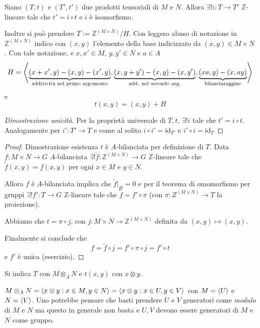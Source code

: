 \begin{proposition}{}
    Siano \({(T, t)}\) e \({(T', t')}\) due prodotti tensoriali di \(M\) e
    \(N\). Allora \(\exists ! i : T \to T'\) \(\mathbb{Z}\)-lineare tale che
    \(t' = i \circ t\) e \(i\) è isomorfismo.

    Inoltre si può prendere \(T := \mathbb{Z}^{{(M \times N)}} / H\). Con
    leggero abuso di notazione in \(\mathbb{Z}^{{(M \times  N)}}\) indico con
    \({(x, y)}\) l'elemento della base indicizzato da \({(x, y)} \in M \times
    N\). Con tale notazione, e \(x, x' \in M\), \(y, y' \in N\) e \(a \in A\) 
    \[
        H = {\left\langle\underbrace{{(x + x', y)} - {(x,y)} -
        {(x',y)}}_{\text{additività nel primo argomento}}, \underbrace{{(x, y +
y')} - {(x,y)} - {(x, y')}}_{\text{add. nel secondo arg.}}, \underbrace{{(xa,y)}
- {(x, ay)}}_{\text{bilanciataggine}}\right\rangle} 
    \]
    e 
    \[
      t{(x,y)} = {(x,y)} + H
    \]
\end{proposition}
\begin{proof}[Dimostrazione unicità]
    Per la proprietà universale di \(T, t\), \(\exists ! i \) tale che \(t' = i
    \circ t\). Analogamente per \(i' : T' \to T\) e come al solito \(i \circ i'
    = \mathrm{id}_{T'} \) e \(i' \circ i = \mathrm{id}_T\) 
\end{proof}
\begin{proof}{Dimostrazione esistenza}
    \(t\) è \(A\)-bilanciata per definizione di \(T\). Data \(f: M \times N \to
    G\) \(A\)-bilanciata \(\exists ! \tilde{f} : \mathbb{Z}^{{(M \times N)}} \to
    G\) \(\mathbb{Z}\)-lineare tale che \(\tilde{f}{(x, y)} = f{(x, y)}\) per
    ogni \(x \in M\) e \(y \in N\).

    Allora \(f\) è \(A\)-bilanciata implica che \(\tilde{f}|_H = 0\) e per il
    teorema di omomorfismo per gruppi \(\exists ! f' : T \to G\)
    \(\mathbb{Z}\)-lineare tale che \(\tilde{f} = f' \circ \pi\) (con \(\pi : Z
    ^{{(M \times N)}} \to T\) la proiezione).

    Abbiamo che \(t = \pi \circ j\), con \(j : M \times N \to \mathbb{Z}^{{(M \times
    N)}}\) definita da \({(x, y)} \mapsto {(x,y)}\).

    Finalmente si conclude che
    \[
      f = \tilde{f} \circ j = f' \circ \pi \circ j = f' \circ t
    \]
    e \(f'\) è unica (esercizio). %
\end{proof}

\begin{note}[zione]
    Si indica \(T\) con \(M \otimes_A N\) e \(t{(x,y)}\) con \(x \otimes y\).
\end{note}
\begin{remark}{}
    \(M \otimes_A N = {\left\langle x \otimes y : x \in M, y \in N\right\rangle} = {\left\langle x \otimes y
    : x \in U, y \in V\right\rangle} \) con \(M = {\left\langle U\right\rangle} \) e \(N = {\left\langle V\right\rangle} \). Uno
    potrebbe pensare che basti prendere \(U\) e \(V\) generatori come
    \emph{modulo} di \(M\) e \(N\) ma questo in generale non basta e \(U, V\)
    devono essere generatori di \(M\) e \(N\) come gruppo.
\end{remark}


